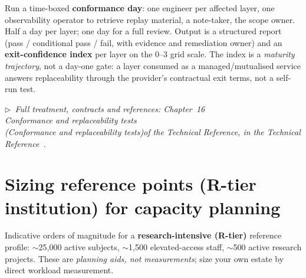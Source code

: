 \documentclass[11pt,a4paper]{article}
\newcommand{\keyword}[1]{\textbf{#1}}
\newcommand{\trchap}[2]{%
  Chapter~#1%
  \ifx\\#2\\\else\space(\emph{#2})\fi\space of the Technical Reference}
\newcommand{\mainref}[1]{%
  \par\vspace{1pt}
  {\footnotesize\color{gray}\itshape
  $\triangleright$~Full treatment, contracts and references: #1,
  in the Technical Reference~\cite{ng-tech-ref-2026}.}\par\vspace{2pt}}
\begin{document}
\begin{principlebox}
Run a time-boxed \keyword{conformance day}: one engineer per affected layer,
one observability operator to retrieve replay material, a note-taker, the
scope owner. Half a day per layer; one day for a full review. Output is a
structured report (pass / conditional pass / fail, with evidence and
remediation owner) and an \keyword{exit-confidence index} per layer on the
0--3 grid scale. The index is a \emph{maturity trajectory}, not a day-one
gate: a layer consumed as a managed/mutualised service answers
replaceability through the provider's contractual exit terms, not a
self-run test.
\end{principlebox}

\mainref{\trchap{16}{Conformance and replaceability tests}}

\section{Sizing reference points (R-tier institution) for capacity planning}

\begin{principlebox}
Indicative orders of magnitude for a \keyword{research-intensive (R-tier)}
reference profile: $\sim$25{,}000 active subjects, $\sim$1{,}500 elevated-access
staff, $\sim$500 active research projects. These are \emph{planning aids,
not measurements}; size your own estate by direct workload measurement.
\end{principlebox}
\end{document}
